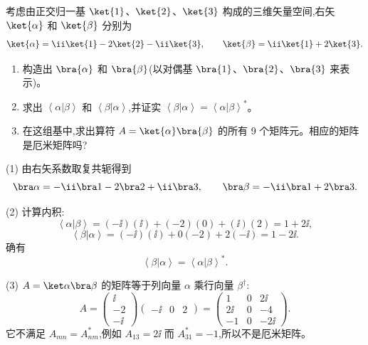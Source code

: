 \begin{question}
考虑由正交归一基 $\ket{1}$、$\ket{2}$、$\ket{3}$ 构成的三维矢量空间,右矢 $\ket{\alpha}$ 和 $\ket{\beta}$ 分别为
\[
\ket{\alpha}=\ii\ket{1}-2\ket{2}-\ii\ket{3},
\qquad
\ket{\beta}=\ii\ket{1}+2\ket{3}.
\]
\begin{enumerate}
\item 构造出 $\bra{\alpha}$ 和 $\bra{\beta}$(以对偶基 $\bra{1}$、$\bra{2}$、$\bra{3}$ 来表示)。
\item 求出 $\left\langle \alpha|\beta \right\rangle$ 和 $\left\langle \beta|\alpha \right\rangle$,并证实 $\left\langle \beta|\alpha \right\rangle=\left\langle \alpha|\beta \right\rangle^*$。
\item 在这组基中,求出算符 $A=\ket{\alpha}\bra{\beta}$ 的所有 9 个矩阵元。相应的矩阵是厄米矩阵吗?
\end{enumerate}
\begin{solution}
(1) 由右矢系数取复共轭得到
\[
\bra\alpha=-\ii\bra1-2\bra2+\ii\bra3,
\qquad
\bra\beta=-\ii\bra1+2\bra3.
\]

(2) 计算内积:
\[
\left\langle \alpha|\beta \right\rangle=(-\ii)(\ii)+(-2)(0)+(\ii)(2)=1+2\ii,
\]
\[
\left\langle \beta|\alpha \right\rangle=(-\ii)(\ii)+0(-2)+2(-\ii)=1-2\ii.
\]
确有
\[
\left\langle \beta|\alpha \right\rangle=\left\langle \alpha|\beta \right\rangle^*.
\]

(3) $A=\ket\alpha\bra\beta$ 的矩阵等于列向量 $\alpha$ 乘行向量 $\beta^\dagger$:
\[
A=\begin{pmatrix}\ii\\-2\\-\ii\end{pmatrix}
\begin{pmatrix}-\ii&0&2\end{pmatrix}
=\begin{pmatrix}
1&0&2\ii\\
2\ii&0&-4\\
-1&0&-2\ii
\end{pmatrix}.
\]
它不满足 $A_{mn}=A_{nm}^*$,例如 $A_{13}=2\ii$ 而 $A_{31}^*=-1$,所以不是厄米矩阵。
\end{solution}
\end{question}

